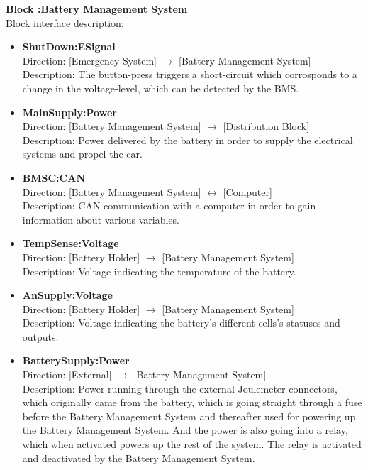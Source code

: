 \textbf{Block :Battery Management System}\\
Block interface description:
\begin{itemize}
	\item \textbf{ShutDown:ESignal}\\
	Direction: [Emergency System] $\rightarrow$ [Battery Management System]\\
	Description: The button-press triggers a short-circuit which corrosponds to a change in the voltage-level, which can be detected by the BMS.
	\item \textbf{MainSupply:Power}\\
	Direction: [Battery Management System] $\rightarrow$ [Distribution Block]\\
	Description: Power delivered by the battery in order to supply the electrical systems and propel the car.
	\item \textbf{BMSC:CAN}\\
	Direction: [Battery Management System] $\leftrightarrow$ [Computer]\\
	Description: CAN-communication with a computer in order to gain information about various variables.
	\item \textbf{TempSense:Voltage}\\
	Direction: [Battery Holder] $\rightarrow$ [Battery Management System]\\
	Description: Voltage indicating the temperature of the battery.
	\item \textbf{AnSupply:Voltage}\\
	Direction: [Battery Holder] $\rightarrow$ [Battery Management System]\\
	Description: Voltage indicating the battery's different cells's statuses and outputs.
	\item \textbf{BatterySupply:Power}\\
	Direction: [External] $\rightarrow$ [Battery Management System]\\
	Description: Power running through the external Joulemeter connectors, which originally came from the battery, which is going straight through a fuse before the Battery Management System and thereafter used for powering up the Battery Management System. And the power is also going into a relay, which when activated powers up the rest of the system. The relay is activated and deactivated by the Battery Management System.
\end{itemize}

